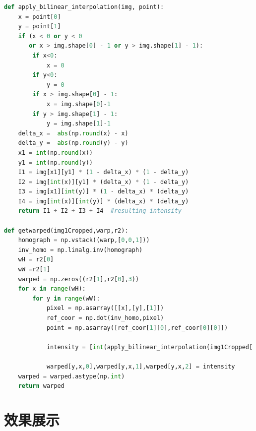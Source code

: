 \documentclass[a4paper]{article}
\begin{document}
 \begin{lstlisting}[language=Python]
def apply_bilinear_interpolation(img, point):
    x = point[0]
    y = point[1] 
    if (x < 0 or y < 0
       or x > img.shape[0] - 1 or y > img.shape[1] - 1):
        if x<0:
            x = 0
        if y<0:
            y = 0
        if x > img.shape[0] - 1:
            x = img.shape[0]-1
        if y > img.shape[1] - 1:
            y = img.shape[1]-1
    delta_x =  abs(np.round(x) - x)
    delta_y =  abs(np.round(y) - y)
    x1 = int(np.round(x))
    y1 = int(np.round(y))
    I1 = img[x1][y1] * (1 - delta_x) * (1 - delta_y)
    I2 = img[int(x)][y1] * (delta_x) * (1 - delta_y)
    I3 = img[x1][int(y)] * (1 - delta_x) * (delta_y)
    I4 = img[int(x)][int(y)] * (delta_x) * (delta_y)
    return I1 + I2 + I3 + I4  #resulting intensity

def getwarped(img1Cropped,warp,r2):
    homograph = np.vstack((warp,[0,0,1]))
    inv_homo = np.linalg.inv(homograph)
    wH = r2[0]
    wW =r2[1]
    warped = np.zeros((r2[1],r2[0],3))
    for x in range(wH):
        for y in range(wW):
            pixel = np.asarray([[x],[y],[1]])
            ref_coor = np.dot(inv_homo,pixel)
            point = np.asarray([ref_coor[1][0],ref_coor[0][0]])

            intensity = [int(apply_bilinear_interpolation(img1Cropped[:,:,i], point)) for i in range(3)]

            warped[y,x,0],warped[y,x,1],warped[y,x,2] = intensity
    warped = warped.astype(np.int)  
    return warped
\end{lstlisting}
\section{效果展示}
\end{document}
